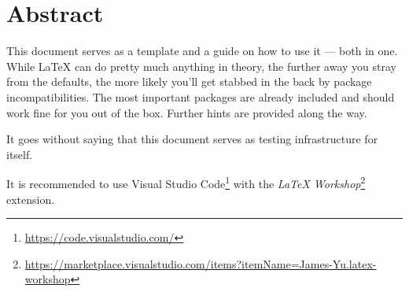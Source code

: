 \chapter*{Abstract}

This document serves as a template and a guide on how to use it --- both in one.
While \LaTeX{} can do pretty much anything in theory, the further away you stray from the defaults, the more likely you'll get stabbed in the back by package incompatibilities.
The most important packages are already included and should work fine for you out of the box.
Further hints are provided along the way.

It goes without saying that this document serves as testing infrastructure for itself.

It is recommended to use Visual Studio Code\footnote{\url{https://code.visualstudio.com/}} with the \emph{LaTeX Workshop}\footnote{\url{https://marketplace.visualstudio.com/items?itemName=James-Yu.latex-workshop}} extension.
